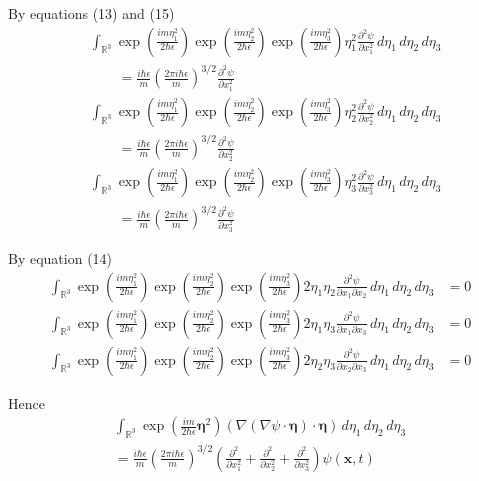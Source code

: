 \documentclass[12pt]{article}
\begin{document}
By equations (13) and (15)
\begin{align*}
&\int_{\mathbb R^3}
\exp\left(\frac{im\eta_1^2}{2\hbar\epsilon}\right)
\exp\left(\frac{im\eta_2^2}{2\hbar\epsilon}\right)
\exp\left(\frac{im\eta_3^2}{2\hbar\epsilon}\right)
\eta_1^2\frac{\partial^2\psi}{\partial x_1^2}
\,d\eta_1\,d\eta_2\,d\eta_3
\\
&\qquad{}=\frac{i\hbar\epsilon}{m}\left(\frac{2\pi i\hbar\epsilon}{m}\right)^{3/2}
\frac{\partial^2\psi}{\partial x_1^2}
\\
&\int_{\mathbb R^3}
\exp\left(\frac{im\eta_1^2}{2\hbar\epsilon}\right)
\exp\left(\frac{im\eta_2^2}{2\hbar\epsilon}\right)
\exp\left(\frac{im\eta_3^2}{2\hbar\epsilon}\right)
\eta_2^2\frac{\partial^2\psi}{\partial x_2^2}
\,d\eta_1\,d\eta_2\,d\eta_3
\\
&\qquad{}=\frac{i\hbar\epsilon}{m}\left(\frac{2\pi i\hbar\epsilon}{m}\right)^{3/2}
\frac{\partial^2\psi}{\partial x_2^2}
\\
&\int_{\mathbb R^3}
\exp\left(\frac{im\eta_1^2}{2\hbar\epsilon}\right)
\exp\left(\frac{im\eta_2^2}{2\hbar\epsilon}\right)
\exp\left(\frac{im\eta_3^2}{2\hbar\epsilon}\right)
\eta_3^2\frac{\partial^2\psi}{\partial x_3^2}
\,d\eta_1\,d\eta_2\,d\eta_3
\\
&\qquad{}=\frac{i\hbar\epsilon}{m}\left(\frac{2\pi i\hbar\epsilon}{m}\right)^{3/2}
\frac{\partial^2\psi}{\partial x_3^2}
\end{align*}

By equation (14)
\begin{align*}
\int_{\mathbb R^3}
\exp\left(\frac{im\eta_1^2}{2\hbar\epsilon}\right)
\exp\left(\frac{im\eta_2^2}{2\hbar\epsilon}\right)
\exp\left(\frac{im\eta_3^2}{2\hbar\epsilon}\right)
2\eta_1\eta_2\frac{\partial^2\psi}{\partial x_1\partial x_2}
\,d\eta_1\,d\eta_2\,d\eta_3
&=0
\\
\int_{\mathbb R^3}
\exp\left(\frac{im\eta_1^2}{2\hbar\epsilon}\right)
\exp\left(\frac{im\eta_2^2}{2\hbar\epsilon}\right)
\exp\left(\frac{im\eta_3^2}{2\hbar\epsilon}\right)
2\eta_1\eta_3\frac{\partial^2\psi}{\partial x_1\partial x_3}
\,d\eta_1\,d\eta_2\,d\eta_3
&=0
\\
\int_{\mathbb R^3}
\exp\left(\frac{im\eta_1^2}{2\hbar\epsilon}\right)
\exp\left(\frac{im\eta_2^2}{2\hbar\epsilon}\right)
\exp\left(\frac{im\eta_3^2}{2\hbar\epsilon}\right)
2\eta_2\eta_3\frac{\partial^2\psi}{\partial x_2\partial x_3}
\,d\eta_1\,d\eta_2\,d\eta_3
&=0
\end{align*}

Hence
\begin{multline*}
\int_{\mathbb R^3}
\exp\left(\frac{im}{2\hbar\epsilon}\boldsymbol\eta^2\right)
(\nabla(\nabla\psi\cdot\boldsymbol\eta)\cdot\boldsymbol\eta)
\,d\eta_1\,d\eta_2\,d\eta_3
\\
{}=\frac{i\hbar\epsilon}{m}\left(\frac{2\pi i\hbar\epsilon}{m}\right)^{3/2}
\left(
\frac{\partial^2}{\partial x_1^2}+
\frac{\partial^2}{\partial x_2^2}+
\frac{\partial^2}{\partial x_3^2}
\right)\psi(\mathbf x,t)
\tag{18}
\end{multline*}
\end{document}
